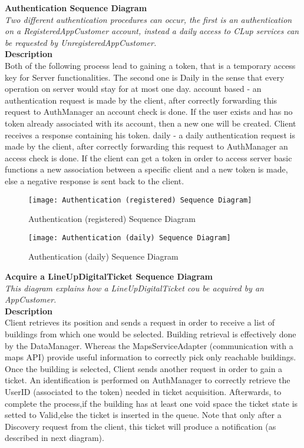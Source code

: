 \newpage
\textbf{Authentication Sequence Diagram\\}
\textit{Two different authentication procedures can occur, the first is an authentication on a RegisteredAppCustomer account, instead a daily access to CLup services can be requested by UnregisteredAppCustomer.\\}
\textbf{Description\\}
Both of the following process lead to gaining a token, that is a temporary access key for Server functionalities. The second one is Daily in the sense that every operation on server would stay for at most one day.
account based - an authentication request is made by the client, after correctly forwarding this request to AuthManager an account check is done. If the user exists and has no token already associated with its account, then a new one will be created. Client receives a response containing his token. 
daily - a daily authentication request is made by the client, after correctly forwarding this request to AuthManager an access check is done. If the client can get a token in order to access server basic functions a new association between a specific client and a new token is made, else a negative response is sent back to the client. \\

\begin{figure}[H]
 \centering
 \texttt{[image: Authentication (registered) Sequence Diagram]}
 \caption{ Authentication (registered) Sequence Diagram}
 \end{figure}

\begin{figure}[H]
 \centering
 \texttt{[image: Authentication (daily) Sequence Diagram]}
 \caption{Authentication (daily) Sequence Diagram}
 \end{figure}

\newpage
\textbf{ Acquire a LineUpDigitalTicket Sequence Diagram\\}
\textit{This diagram explains how a LineUpDigitalTicket cou be acquired by an AppCustomer.\\}
\textbf{Description\\}
Client retrieves its position and sends a request in order to receive a list of buildings from which one would be selected. Building retrieval is effectively done by the DataManager. Whereas the MapsServiceAdapter (communication with a maps API) provide useful information to correctly pick only reachable buildings.
Once the building is selected, Client sends another request in order to gain a ticket. An identification is performed on AuthManager to correctly retrieve the UserID (associated to the token) needed in ticket acquisition. Afterwards, to complete the process,if the building has at least one void space the ticket state is setted to Valid,else the ticket is inserted in the queue.
Note that only after a Discovery request from the client, this ticket will produce a notification (as described in next diagram).\\

